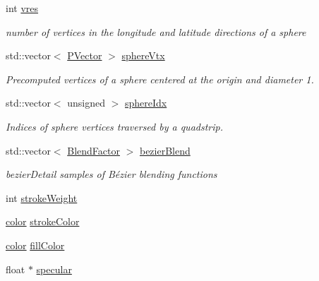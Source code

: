 \begin{DoxyCompactItemize}
\item 
int \hyperlink{classcprocessing_1_1Style_a84582322d95a21a724c07d9c4aea0ca9}{vres}
\begin{DoxyCompactList}\small\item\em number of vertices in the longitude and latitude directions of a sphere \end{DoxyCompactList}\item 
std\-::vector$<$ \hyperlink{classcprocessing_1_1PVector}{\-P\-Vector} $>$ \hyperlink{classcprocessing_1_1Style_a03aa1c2223d266bf0936c667a52c3800}{sphere\-Vtx}
\begin{DoxyCompactList}\small\item\em \-Precomputed vertices of a sphere centered at the origin and diameter 1. \end{DoxyCompactList}\item 
std\-::vector$<$ unsigned $>$ \hyperlink{classcprocessing_1_1Style_a591c6314312702ff1ef3605fd667b37e}{sphere\-Idx}
\begin{DoxyCompactList}\small\item\em \-Indices of sphere vertices traversed by a quadstrip. \end{DoxyCompactList}\item 
std\-::vector$<$ \hyperlink{style_8hpp_ac520a753204252020496de2d7d0a42f9}{\-Blend\-Factor} $>$ \hyperlink{classcprocessing_1_1Style_a0c309b04401c12d97be2d9844582311e}{bezier\-Blend}
\begin{DoxyCompactList}\small\item\em bezier\-Detail samples of \-Bézier blending functions \end{DoxyCompactList}\item 
int \hyperlink{classcprocessing_1_1Style_a94d3946ede16f831add95bc8b51b593c}{stroke\-Weight}
\item 
\hyperlink{classcprocessing_1_1color}{color} \hyperlink{classcprocessing_1_1Style_a23b32198997fa6b8da302adf7810f79b}{stroke\-Color}
\item 
\hyperlink{classcprocessing_1_1color}{color} \hyperlink{classcprocessing_1_1Style_a192c5df80b11b4ca13f27b7fbdb1c432}{fill\-Color}
\item 
float $\ast$ \hyperlink{classcprocessing_1_1Style_a87b9759761331ce9d9e6f1f1fef6943f}{specular}
\end{DoxyCompactItemize}


